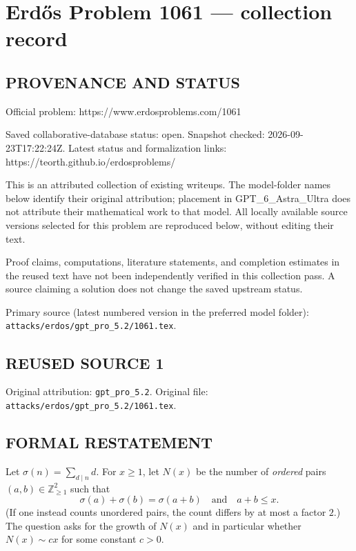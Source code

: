 \section*{Erd\H{o}s Problem 1061 --- collection record}

\subsection*{PROVENANCE AND STATUS}
Official problem: https://www.erdosproblems.com/1061

Saved collaborative-database status: open.
Snapshot checked: 2026-09-23T17:22:24Z.
Latest status and formalization links: https://teorth.github.io/erdosproblems/

This is an attributed collection of existing writeups. The model-folder names below identify their original attribution; placement in GPT\_6\_Astra\_Ultra does not attribute their mathematical work to that model. All locally available source versions selected for this problem are reproduced below, without editing their text.

Proof claims, computations, literature statements, and completion estimates in the reused text have not been independently verified in this collection pass. A source claiming a solution does not change the saved upstream status.

Primary source (latest numbered version in the preferred model folder): \texttt{attacks/erdos/gpt\_pro\_5.2/1061.tex}.

\subsection*{REUSED SOURCE 1}
Original attribution: \texttt{gpt\_pro\_5.2}.
Original file: \texttt{attacks/erdos/gpt\_pro\_5.2/1061.tex}.


\subsection*{FORMAL RESTATEMENT}
Let $\sigma(n)=\sum_{d\mid n} d$. For $x\ge 1$, let $N(x)$ be the number of \emph{ordered} pairs $(a,b)\in\mathbb Z_{\ge 1}^2$ such that
\[
\sigma(a)+\sigma(b)=\sigma(a+b)\quad\text{and}\quad a+b\le x.
\]
(If one instead counts unordered pairs, the count differs by at most a factor $2$.)
The question asks for the growth of $N(x)$ and in particular whether $N(x)\sim c x$ for some constant $c>0$.

